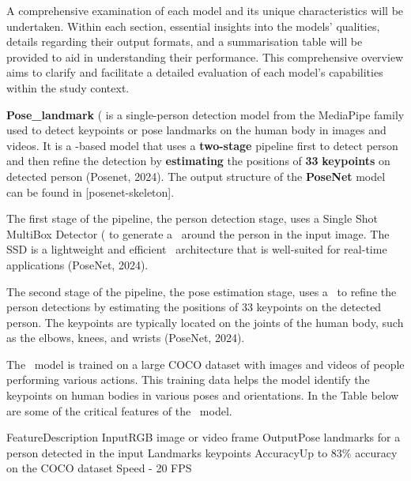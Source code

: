 A comprehensive examination of each model and its unique characteristics will be undertaken. Within each section, essential insights into the models' qualities, details regarding their output formats, and a summarisation table will be provided to aid in understanding their performance. This comprehensive overview aims to clarify and facilitate a detailed evaluation of each model's capabilities within the study context.

{\bf Pose_landmark} (\PoseNet\) is a single-person detection model from the MediaPipe family used to detect keypoints or pose landmarks on the human body in images and videos. It is a \CNN\--based model that uses a {\bf two-stage} pipeline first to detect person {\bf \BBOX} and then refine the detection by {\bf estimating} the positions of {\bf 33} {\bf keypoints} on detected person (\scc Posenet, 2024). The output structure of the {\bf PoseNet} model can be found in [posenet-skeleton].

The first stage of the pipeline, the person detection stage, uses a Single Shot MultiBox Detector (\SSD\) to generate a \BBOX\ around the person in the input image. The SSD is a lightweight and efficient \CNN\ architecture that is well-suited for real-time applications (\scc PoseNet, 2024).

The second stage of the pipeline, the pose estimation stage, uses a \CNN\ to refine the person detections by estimating the positions of 33 keypoints on the detected person. The keypoints are typically located on the joints of the human body, such as the elbows, knees, and wrists (\scc PoseNet, 2024).

The \PoseNet\ model is trained on a large COCO dataset with images and videos of people performing various actions. This training data helps the model identify the keypoints on human bodies in various poses and orientations. In the Table below are some of the critical features of the \PoseNet\ model.

 \setupTABLE[r][1][style=bold]
 \setupTABLE[c][each][offset=3dd]
 \setupTABLE[frame=off]
 \setupTABLE[r][1][topframe=on,bottomframe=on]
 \setupTABLE[c][each][leftframe=on]
 \setupTABLE[c][1][leftframe=off]
 \bTR
 \bTD Feature\eTD\bTD Description\eTD\eTR
 \bTR
 \bTD Input\eTD\bTD RGB image or video frame\eTD\eTR
 \bTR
 \bTD Output\eTD\bTD Pose landmarks for a person detected in the input\eTD\eTR
 \bTR
 \bTD Landmarks\eTD{} keypoints\eTD\eTR
 \bTR
 \bTD Accuracy\eTD\bTD Up to 83\% accuracy on the COCO dataset\eTD\eTR
 \bTR
 \bTD Speed\eTD{} - 20 FPS\eTD\eTR

